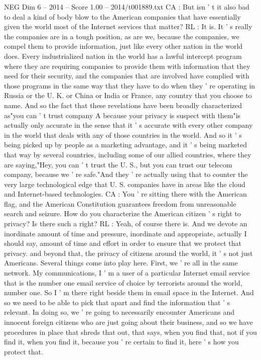 \begin{textsample}{NEG Dim 6 – 2014 – Score 1.00 – 2014/t001889.txt}
CA : But isn ' t it also bad to deal a kind of body blow to the American companies that have essentially given the world most of the Internet services that matter?
RL : It is.
It ' s really the companies are in a tough position, as are we, because the companies, we compel them to provide information, just like every other nation in the world does.
Every industrialized nation in the world has a lawful intercept program where they are requiring companies to provide them with information that they need for their security, and the companies that are involved have complied with those programs in the same way that they have to do when they ' re operating in Russia or the U.
K. or China or India or France, any country that you choose to name.
And so the fact that these revelations have been broadly characterized as"you can ' t trust company A because your privacy is suspect with them"is actually only accurate in the sense that it ' s accurate with every other company in the world that deals with any of those countries in the world.
And so it ' s being picked up by people as a marketing advantage, and it ' s being marketed that way by several countries, including some of our allied countries, where they are saying,"Hey, you can ' t trust the U.
S., but you can trust our telecom company, because we ' re safe."And they ' re actually using that to counter the very large technological edge that U.
S. companies have in areas like the cloud and Internet-based technologies.
CA : You ' re sitting there with the American flag, and the American Constitution guarantees freedom from unreasonable search and seizure.
How do you characterize the American citizen ' s right to privacy?
Is there such a right?
RL : Yeah, of course there is.
And we devote an inordinate amount of time and pressure, inordinate and appropriate, actually I should say, amount of time and effort in order to ensure that we protect that privacy. and beyond that, the privacy of citizens around the world, it ' s not just Americans.
Several things come into play here.
First, we ' re all in the same network.
My communications, I ' m a user of a particular Internet email service that is the number one email service of choice by terrorists around the world, number one.
So I ' m there right beside them in email space in the Internet.
And so we need to be able to pick that apart and find the information that ' s relevant.
In doing so, we ' re going to necessarily encounter Americans and innocent foreign citizens who are just going about their business, and so we have procedures in place that shreds that out, that says, when you find that, not if you find it, when you find it, because you ' re certain to find it, here ' s how you protect that.

\end{textsample}
